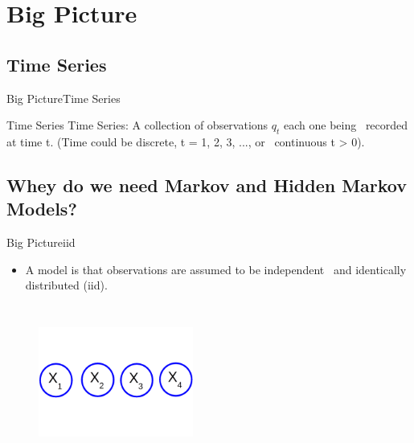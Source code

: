 \documentclass[10pt]{beamer}
\begin{document}
\section{Big Picture}
\subsection{Time Series}
\begin{frame}{Big Picture}{Time Series}
  \begin{block}{Time Series}
          Time Series: A collection of observations $q_t$ each one being \
          recorded at time t. (Time could be discrete, t = 1, 2, 3, ..., or \
          continuous t > 0). \cite{Richard}
  \end{block}
\end{frame}

\subsection{Whey do we need Markov and Hidden Markov Models?}
\begin{frame}{Big Picture}{iid}
  \begin{itemize}
    \item A model is that observations are assumed to be independent \
          and identically distributed (iid). \cite{Thomas}
  \end{itemize}
  \begin{figure}[h]
    \centering
    \includegraphics[width=2in,height=2in]{figures/idd.png}
  \end{figure}
\end{frame}
\end{document}
